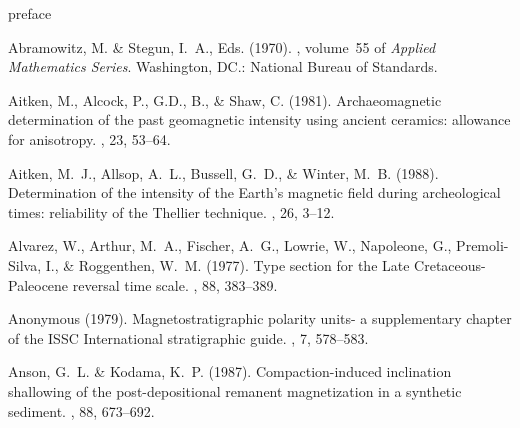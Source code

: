 \documentclass[11pt]{book}
\begin{document}
\setcounter{page}{1}
 {preface}
\setcounter{tocdepth}{3}
\tableofcontents
\clearpage
{}
\setcounter{page}{1}




 


  




 

 


%
%
\begin{thebibliography}{}

Abramowitz, M. \& Stegun, I.~A., Eds. (1970).
, volume~55 of {\em Applied
  Mathematics Series}.
\newblock Washington, DC.: National Bureau of Standards.

Aitken, M., Alcock, P., G.D., B., \& Shaw, C. (1981).
\newblock Archaeomagnetic determination of the past geomagnetic intensity using
  ancient ceramics: allowance for anisotropy.
, 23, 53--64.

Aitken, M.~J., Allsop, A.~L., Bussell, G.~D., \& Winter, M.~B. (1988).
\newblock Determination of the intensity of the Earth's magnetic field during
  archeological times: reliability of the Thellier technique.
, 26, 3--12.

Alvarez, W., Arthur, M.~A., Fischer, A.~G., Lowrie, W., Napoleone, G.,
  Premoli-Silva, I., \& Roggenthen, W.~M. (1977).
\newblock Type section for the Late Cretaceous-Paleocene reversal time scale.
, 88, 383--389.

Anonymous (1979).
\newblock Magnetostratigraphic polarity units- a supplementary chapter of the
  {ISSC} International stratigraphic guide.
, 7, 578--583.

Anson, G.~L. \& Kodama, K.~P. (1987).
\newblock Compaction-induced inclination shallowing of the post-depositional
  remanent magnetization in a synthetic sediment.
, 88, 673--692.


\end{thebibliography}
\end{document}
